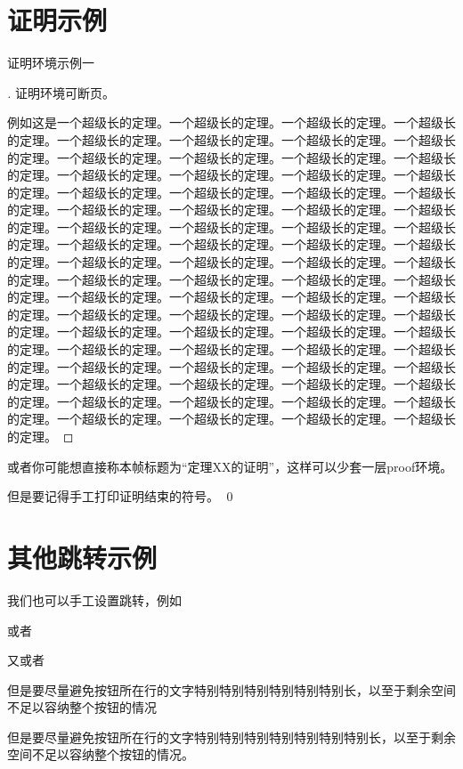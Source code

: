 \documentclass[logoopacity=0.1]{scnubeamer}
\theoremstyle{definition}
\theoremstyle{example}
\begin{document}
\section{证明示例}

\begin{frame}[allowframebreaks]{证明环境示例一}
\begin{proof}[]
证明环境可断页。

例如这是一个超级长的定理。一个超级长的定理。一个超级长的定理。一个超级长的定理。一个超级长的定理。一个超级长的定理。一个超级长的定理。一个超级长的定理。一个超级长的定理。一个超级长的定理。一个超级长的定理。一个超级长的定理。一个超级长的定理。一个超级长的定理。一个超级长的定理。一个超级长的定理。一个超级长的定理。一个超级长的定理。一个超级长的定理。一个超级长的定理。一个超级长的定理。一个超级长的定理。一个超级长的定理。一个超级长的定理。一个超级长的定理。一个超级长的定理。一个超级长的定理。一个超级长的定理。一个超级长的定理。一个超级长的定理。一个超级长的定理。一个超级长的定理。一个超级长的定理。一个超级长的定理。一个超级长的定理。一个超级长的定理。一个超级长的定理。一个超级长的定理。一个超级长的定理。一个超级长的定理。一个超级长的定理。一个超级长的定理。一个超级长的定理。一个超级长的定理。一个超级长的定理。一个超级长的定理。一个超级长的定理。一个超级长的定理。一个超级长的定理。一个超级长的定理。一个超级长的定理。一个超级长的定理。一个超级长的定理。一个超级长的定理。一个超级长的定理。一个超级长的定理。一个超级长的定理。一个超级长的定理。一个超级长的定理。一个超级长的定理。一个超级长的定理。一个超级长的定理。一个超级长的定理。一个超级长的定理。一个超级长的定理。一个超级长的定理。一个超级长的定理。一个超级长的定理。一个超级长的定理。一个超级长的定理。一个超级长的定理。一个超级长的定理。
\end{proof}
\end{frame}

\begin{frame}{}
或者你可能想直接称本帧标题为“定理XX的证明”，这样可以少套一层proof环境。

但是要记得手工打印证明结束的符号。
\qed
\end{frame}

\section{其他跳转示例}

\begin{frame}
我们也可以手工设置跳转，例如

或者

又或者

但是要尽量避免按钮所在行的文字特别特别特别特别特别特别长，以至于剩余空间不足以容纳整个按钮的情况%

但是要尽量避免按钮所在行的文字特别特别特别特别特别特别特别长，以至于剩余空间不足以容纳整个按钮的情况。\\
\end{frame}
\end{document}
